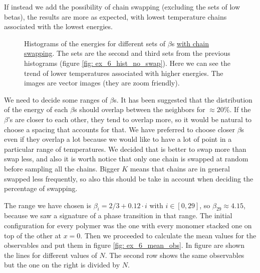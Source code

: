 \documentclass[../main.tex]{subfiles}
\begin{document}
If instead we add the possibility of chain swapping (excluding the sets of low betas), the results are more as expected, with lowest temperature chains associated with the lowest energies.

\begin{figure}[H]
    \centering
    \begin{subfigure}{.49\textwidth}
        \centering
        
    \end{subfigure}
    \begin{subfigure}{.49\textwidth}
        \centering
        
    \end{subfigure}
    \caption{Histograms of the energies for different sets of $\beta $s \underline{with chain swapping}. The sets are the second and third sets from the previous histograms (figure \ref{fig: ex_6_hist_no_swap}). Here we can see the trend of lower temperatures associated with higher energies.  The images are vector images (they are zoom friendly).}
    \label{fig: ex_6_hist_swap}
\end{figure}


We need to decide some ranges of $\beta$s. It has been suggested that the distribution of the energy of each $\beta$s should overlap between the neighbors for $\approx20\%$. If the $\beta$'s are closer to each other, they tend to overlap more, so it would be natural to choose a spacing that accounts for that. We have preferred to choose closer $\beta$s even if they overlap a lot because we would like to have a lot of point in a particular range of temperatures. We decided that is better to swap more than swap less, and also it is worth notice that only one chain is swapped at random before sampling all the chains. Bigger $K$ means that chains are in general swapped less frequently, so also this should be take in account when deciding the percentage of swapping.

The range we have chosen is $\beta_i = 2/3 + 0.12\cdot i$ with $i \in [0, 29]$, so $\beta_{29} \approx 4.15$, because we saw a signature of a phase transition in that range.
The initial configuration for every polymer was the one with every monomer stacked one on top of the other at $x=0$. Then we proceeded to calculate the mean values for the observables and put them in figure \ref{fig: ex_6_mean_obs}. In figure are shown the lines for different values of $N$. The second row shows the same observables but the one on the right is divided by $N$.
\end{document}
